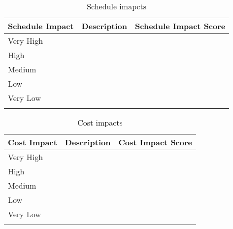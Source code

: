 \begin{longtable}[H]{l >{\raggedright\arraybackslash}p{6.6cm} p{4cm}}
	
	\toprule[2pt]
	
	\textbf{Schedule Impact} &  \textbf{Description}  & \textbf{Schedule Impact Score} \\
	
	\midrule [1.5pt]
	\endhead
	
	Very High &  & 
	\vspace{0.2cm} \\
	
	\midrule
	
	High &  & 
	\vspace{0.2cm} \\
	
	\midrule
	
	Medium &  & 
	\vspace{0.2cm} \\

	\midrule

	Low &  & 
	\vspace{0.2cm} \\

	\midrule

	Very Low &  & 
	\vspace{0.2cm} \\
		
	\bottomrule[2pt]
	
	\caption{Schedule imapcts}

\end{longtable}




\begin{longtable}[H]{l >{\raggedright\arraybackslash}p{7.8cm} p{3.5cm}}
	
	\toprule[2pt]
	
	\textbf{Cost Impact} &  \textbf{Description}  & \textbf{Cost Impact Score} \\
	
	\midrule [1.5pt]
	\endhead
	
	Very High &  & 
	\vspace{0.2cm} \\
	
	\midrule
	
	High &  & 
	\vspace{0.2cm} \\
	
	\midrule
	
	Medium &  & 
	\vspace{0.2cm} \\

	\midrule

	Low &  & 
	\vspace{0.2cm} \\

	\midrule

	Very Low &  & 
	\vspace{0.2cm} \\
		
	\bottomrule[2pt]
	
	\caption{Cost impacts}

\end{longtable}